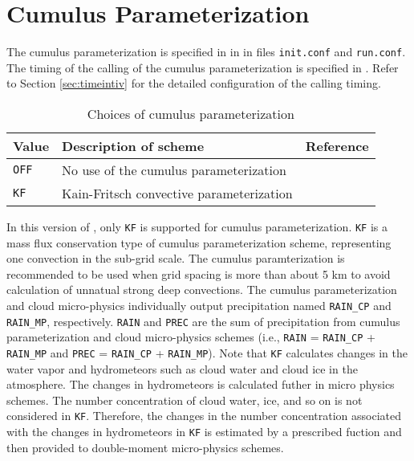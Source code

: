
\section{Cumulus Parameterization} \label{sec:basic_usel_cumulus}

The cumulus parameterization is specified in  in  in files \verb|init.conf| and \verb|run.conf|. The timing of the calling of the cumulus parameterization is specified in . Refer to Section \ref{sec:timeintiv} for the detailed configuration of the calling timing.

\begin{table}[h]
\begin{center}
  \caption{Choices of cumulus parameterization}
  \label{tab:nml_atm_cp}
  \begin{tabularx}{150mm}{lXX} \hline
    \rowcolor[gray]{0.9}  Value & Description of scheme & Reference\\ \hline
      \verb|OFF|  & No use of the cumulus parameterization &  \\
      \verb|KF|   & Kain-Fritsch convective parameterization & \citet{kain_1990,kain_2004} \\
    \hline
  \end{tabularx}
\end{center}
\end{table}

In this version of \scalerm, only \verb|KF| is supported for cumulus parameterization. \verb|KF| is a mass flux conservation type of cumulus parameterization scheme, representing one convection in the sub-grid scale.
The cumulus paramterization is recommended to be used when grid spacing is more than about 5 km to avoid calculation of unnatual strong deep convections.
The cumulus parameterization and cloud micro-physics individually output 
precipitation named \verb|RAIN_CP| and \verb|RAIN_MP|, respectively. 
\verb|RAIN| and \verb|PREC| are the sum of precipitation 
from cumulus parameterization and cloud micro-physics schemes 
(i.e., \verb|RAIN| = \verb|RAIN_CP| + \verb|RAIN_MP|
and \verb|PREC| = \verb|RAIN_CP| + \verb|RAIN_MP|).
Note that \verb|KF| calculates changes in the water vapor and
hydrometeors such as cloud water and cloud ice in the atmosphere.
The changes in hydrometeors is calculated futher in micro physics schemes.
The number concentration of cloud water, ice, and so on
is not considered in \verb|KF|.
Therefore, 
the changes in the number concentration 
associated with the changes in hydrometeors in \verb|KF|
is estimated by a prescribed fuction
and then
provided to double-moment micro-physics schemes.



